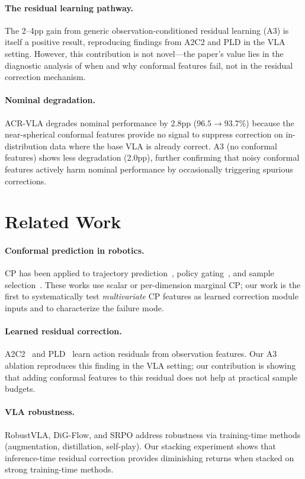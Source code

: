 \documentclass[letterpaper]{article}
\begin{document}
\paragraph{The residual learning pathway.}
The 2--4pp gain from generic observation-conditioned residual learning (A3) is itself a positive result, reproducing findings from A2C2 and PLD in the VLA setting.
However, this contribution is not novel---the paper's value lies in the diagnostic analysis of when and why conformal features fail, not in the residual correction mechanism.

\paragraph{Nominal degradation.}
ACR-VLA degrades nominal performance by 2.8pp ($96.5 \to 93.7$\%) because the near-spherical conformal features provide no signal to suppress correction on in-distribution data where the base VLA is already correct.
A3 (no conformal features) shows less degradation (2.0pp), further confirming that noisy conformal features actively harm nominal performance by occasionally triggering spurious corrections.

\section{Related Work}

\paragraph{Conformal prediction in robotics.}
CP has been applied to trajectory prediction~\citep{lindemann2023safe}, policy gating~\citep{dixit2024ups}, and sample selection~\citep{luo2024reconvla}.
These works use scalar or per-dimension marginal CP; our work is the first to systematically test \emph{multivariate} CP features as learned correction module inputs and to characterize the failure mode.

\paragraph{Learned residual correction.}
A2C2~\citep{ankile2024a2c2} and PLD~\citep{shi2024pld} learn action residuals from observation features.
Our A3 ablation reproduces this finding in the VLA setting; our contribution is showing that adding conformal features to this residual does not help at practical sample budgets.

\paragraph{VLA robustness.}
RobustVLA, DiG-Flow, and SRPO address robustness via training-time methods (augmentation, distillation, self-play).
Our stacking experiment shows that inference-time residual correction provides diminishing returns when stacked on strong training-time methods.
\end{document}
